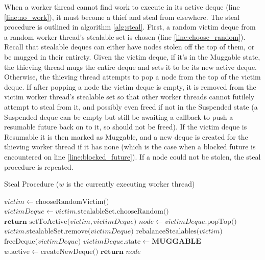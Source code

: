 \documentclass[bsc,frontabs,singlespacing,parskip,deptreport,normalheadings]{infthesis}
\begin{document}
When a worker thread cannot find work to execute in its active deque (line
\ref{line:no_work}), it must become a thief and steal from elsewhere. The steal
procedure is outlined in algorithm \ref{alg:steal}. First, a random victim deque
from a random worker thread's stealable set is chosen (line
\ref{line:choose_random}). Recall that stealable deques can either have nodes
stolen off the top of them, or be mugged in their entirety. Given the victim
deque, if it's in the Muggable state, the thieving thread mugs the entire
deque and sets it to be its new active deque. Otherwise, the thieving thread
attempts to pop a node from the top of the victim deque. If after popping a node
the victim deque is empty, it is removed from the victim worker thread's
stealable set so that other worker threads cannot futilely attempt to steal from
it, and possibly even freed if not in the Suspended state (a Suspended deque can
be empty but still be awaiting a callback to push a resumable future back on to
it, so should not be freed). If the victim deque is Resumable it is then marked
as Muggable, and a new deque is created for the thieving worker thread if it has
none (which is the case when a blocked future is encountered on line
\ref{line:blocked_future}). If a node could not be stolen, the steal procedure
is repeated.

\begin{algorithm}
\caption{Steal Procedure ($w$ is the currently executing worker thread)}\label{alg:steal}
\begin{algorithmic}[1]
            \State $victim \gets \text{chooseRandomVictim()} $
                \label{line:choose_random_victim}
            \State $ victimDeque \gets victim \text{.stealableSet.chooseRandom()} $
                \label{line:choose_random}
                \State $ \textbf{return } \text{setToActive(} victim, victimDeque \text{)}$ 
            \EndIf
            \State $ node \gets victimDeque \text{.popTop()} $
                \State $ victim \text{.stealableSet.remove(} victimDeque \text{)} $
                \State $ \text{rebalanceStealables(} victim \text{)} $
                    \label{line:rebalance_1}
                    \State $ \text{freeDeque(} victimDeque \text{)} $
                \EndIf
                \State $victimDeque\text{.state} \gets \textbf{MUGGABLE}$
            \EndIf
                    \State $w \text{.active} \gets \text{createNewDeque()}$
                \EndIf
                \State $ \textbf{return } node $
            \EndIf
        \EndWhile
    \EndFunction
\end{algorithmic}
\end{algorithm}
\end{document}
